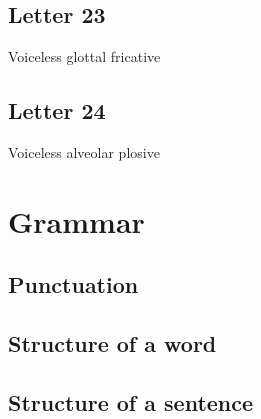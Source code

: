 \documentclass{book}
\newcommand{\letter}[1]{\begin{center}\resizebox{1cm}{!}{\texttt{[image: \#1]}}\end{center}}
\begin{document}
\section{Letter 23}
Voiceless glottal fricative

\letter{letters/consonants/23.JPG}


\section{Letter 24}
Voiceless alveolar plosive

\letter{letters/consonants/24.JPG}



\chapter{Grammar}
\section{Punctuation}


\section{Structure of a word}


\section{Structure of a sentence}
\end{document}
